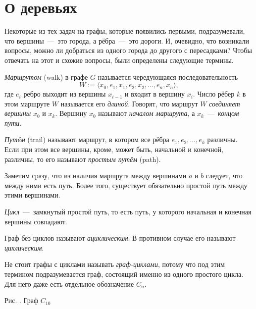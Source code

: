 \section{О деревьях}

	Некоторые из тех задач на графы, которые появились первыми, подразумевали, что вершины~---~это города, а рёбра~---~это дороги. И, очевидно, что возникали вопросы, можно ли добраться из одного города до другого с пересадками? Чтобы отвечать на этот и схожие вопросы, были определены следующие термины.
	
\begin{definition}
	\emph{Маршрутом} (walk) в графе $G$ называется чередующаяся последовательность 
	$$W := \langle x_0, e_1, x_1, e_2, x_2,\dots, e_n, x_n\rangle,$$
	где $e_i$ ребро выходит из вершины $x_{i-1}$ и входит в вершину $x_{i}$. Число рёбер $k$ в этом маршруте $W$ называется его \emph{длиной}. Говорят, что маршрут $W$ \emph{соединяет вершины} $x_0$ и $x_k$. Вершину $x_0$ называют \emph{началом маршрута}, а $x_k$~---~\emph{концом пути}.
\end{definition}

\begin{definition}
	\emph{Путём} (trail) называют маршрут, в котором все рёбра $e_1, e_2, \dots, e_k$ различны. Если при этом все вершины, кроме, может быть, начальной и конечной, различны, то его называют \emph{простым путём} (path).
\end{definition}
	
	Заметим сразу, что из наличия маршрута между вершинами $a$ и $b$ следует, что между ними есть путь. Более того, существует обязательно простой путь между этими вершинами.

\begin{paracol}{2}
\begin{definition}
	\emph{Цикл}~---~замкнутый простой путь, то есть путь, у которого начальная и конечная вершины совпадают.
\end{definition}

\begin{definition}
	Граф без циклов называют \emph{ациклическим}. В противном случае его называют \emph{циклическим}.
\end{definition}

	Не стоит графы с циклами называть \emph{граф-циклами}, потому что под этим термином подразумевается граф, состоящий именно из одного простого цикла. Для него даже есть отдельное обозначение $C_n$.
\switchcolumn

\begin{center}\end{center}
\begin{center}
	\small Рис. \images. Граф $C_{10}$
\end{center}\end{paracol}

